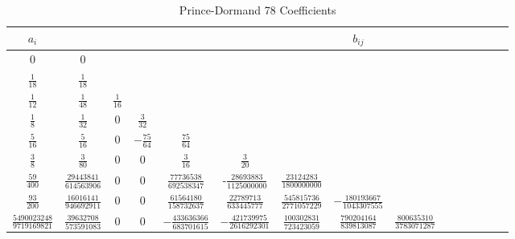 
\begin{landscape}
\begin{table*}
\centering
{}
\caption{Prince-Dormand 78 Coefficients }
\begin{tabular}{c|cccccccccccccc}
   $a_i$ & & & & & & & $b_{ij}$ & & & & & \\
   \hline\hline
   0  & 0 \vspace{.1in} \\
   $\frac{1}{18}$ & $\frac{1}{18}$ \vspace{.1in} \\
   $\frac{1}{12}$ &  $\frac{1}{48 }$ & $\frac{ 1 }{ 16 }$ \vspace{.1in} \\
   $\frac{1}{8}$  & $\frac{1}{ 32}$ & 0 & $\frac{3}{32}$ \vspace{.1in} \\
   $\frac{5}{ 16}$ & $\frac{5}{16}$ & 0 & $-\frac{75}{64}$ & $\frac{75 }{64 }$\vspace{.1in} \\
    $\frac{3}{8}$ & $\frac{ 3}{80}$  & 0 &  0 & $\frac{3}{16}$ & $\frac{3}{20}$ \vspace{.1in} \\
    $\frac{59}{400}$ & $\frac{29443841}{614563906}$ & 0 & 0 & $\frac{77736538}{692538347}$
    & -$\frac{28693883}{1125000000}$ &$\frac{23124283}{1800000000}$  \vspace{.1in} \\
   $\frac{93}{200}$ &     $\frac{16016141}{ 946692911}$ & 0 & 0 &  $\frac{61564180}{  158732637}$ &
    $\frac{22789713}{ 633445777}$ & $\frac{545815736}{  2771057229}$ &
    $-\frac{180193667}{1043307555}$ & \vspace{.1in} \\
    $\frac{5490023248}{9719169821}$ &     $\frac{39632708}{  573591083}$ & 0 & 0 & $-\frac{433636366}{ 683701615}$
    & $-\frac{421739975}{ 2616292301}$ & $\frac{100302831}{ 723423059}$ &
    $\frac{790204164}{ 839813087}$ & $\frac{800635310}{ 3783071287}$ & \vspace{.1in} \\

\end{tabular}
\end{table*}
\end{landscape}
